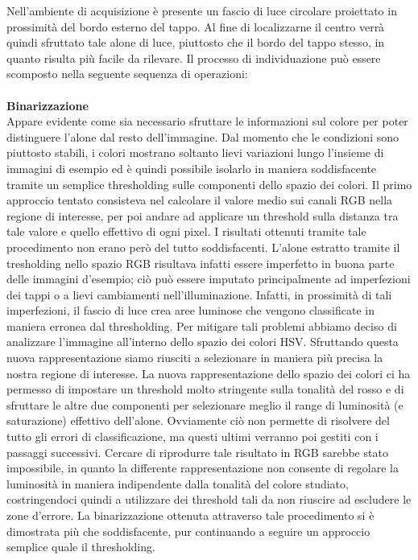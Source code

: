 Nell'ambiente di acquisizione è presente un fascio di luce circolare proiettato in prossimità del bordo esterno del tappo.  Al fine di localizzarne il centro verrà quindi sfruttato tale alone di luce, piuttosto che il bordo del tappo stesso, in quanto risulta più facile da rilevare. Il processo di individuazione può essere scomposto nella seguente sequenza di operazioni:
\\
\\
\noindent
\textbf{Binarizzazione}
\\ 
Appare evidente come sia necessario sfruttare le informazioni sul colore per poter distinguere l'alone dal resto dell’immagine. Dal momento che le condizioni sono piuttosto stabili, i colori mostrano soltanto lievi variazioni lungo l’insieme di immagini di esempio ed è quindi possibile isolarlo in maniera soddisfacente tramite un semplice thresholding sulle componenti dello spazio dei colori.
Il primo approccio tentato consisteva nel calcolare il valore medio sui canali RGB nella regione di interesse, per poi andare ad applicare un threshold sulla distanza tra tale valore e quello effettivo di ogni pixel. I risultati ottenuti tramite tale procedimento non erano però del tutto soddisfacenti. L’alone estratto tramite il tresholding nello spazio RGB risultava infatti essere imperfetto in buona parte delle immagini d’esempio; ciò può essere imputato principalmente ad imperfezioni dei tappi o a lievi cambiamenti nell'illuminazione. Infatti, in prossimità di tali imperfezioni, il fascio di luce crea aree luminose che vengono classificate in maniera erronea dal thresholding.
Per mitigare tali problemi abbiamo deciso di analizzare l’immagine all’interno dello spazio dei colori HSV. Sfruttando questa nuova rappresentazione siamo riusciti a selezionare in maniera più precisa la nostra regione di interesse. La nuova rappresentazione dello spazio dei colori ci ha permesso di impostare un threshold molto stringente sulla tonalità del rosso e di sfruttare le altre due componenti per selezionare meglio il range di luminosità (e saturazione) effettivo dell'alone. Ovviamente ciò non permette di risolvere del tutto gli errori di classificazione, ma questi ultimi verranno poi gestiti con i passaggi successivi. Cercare di riprodurre tale risultato in RGB sarebbe stato impossibile, in quanto la differente rappresentazione non consente di regolare la luminosità in maniera indipendente dalla tonalità del colore studiato, costringendoci quindi a utilizzare dei threshold tali da non riuscire ad escludere le zone d'errore.
La binarizzazione ottenuta attraverso tale procedimento si è dimostrata più che soddisfacente, pur continuando a seguire un approccio semplice quale il thresholding.
\\
 
